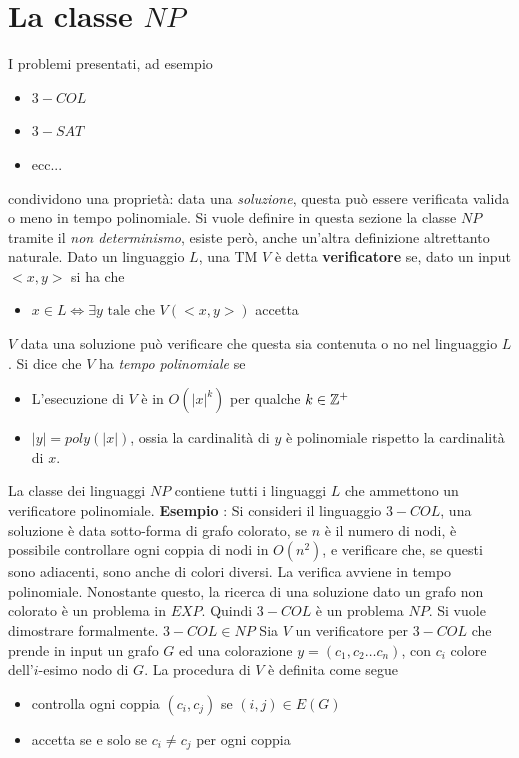 \documentclass[10pt, letterpaper]{report}
\begin{document}
\section{La classe $NP$}
I problemi presentati, ad esempio 
\begin{itemize}
    \item $3-COL$
    \item $3-SAT$
    \item ecc...
\end{itemize}
condividono una proprietà: data una \textit{soluzione}, questa può essere verificata valida o meno in tempo polinomiale. Si vuole definire in questa sezione la classe $NP$ tramite il \textit{non determinismo}, esiste però, anche un'altra definizione altrettanto naturale.\acc 
{} Dato un linguaggio $L$, una TM $V$ è detta \textbf{verificatore} se, dato un input $<x,y>$ si ha che \begin{itemize}
    \item $x\in L \iff \exists y \text{ tale che }V(<x,y>)$ accetta
\end{itemize}
$V$ data una soluzione può verificare che questa sia contenuta o no nel linguaggio $L$. Si dice che $V$ ha \textit{tempo polinomiale} se \begin{itemize}
    \item L'esecuzione di $V$ è in $O(|x|^k)$ per qualche $k\in{\mathbb Z}^+$
    \item $|y|=poly(|x|)$, ossia la cardinalità di $y$ è polinomiale rispetto la cardinalità di $x$.
\end{itemize}
 La classe dei linguaggi $NP$ contiene tutti i linguaggi $L$ che ammettono un verificatore polinomiale.\acc 
\textbf{Esempio} : Si consideri il linguaggio $3-COL$, una soluzione è data sotto-forma di grafo colorato, se $n$ è il numero di nodi,  è possibile controllare ogni coppia di nodi in $O(n^2)$, e verificare che, se questi sono adiacenti, sono anche di colori diversi. La verifica avviene in tempo polinomiale. Nonostante questo, la ricerca di una soluzione dato un grafo non colorato è un problema in $EXP$. Quindi $3-COL$ è un problema $NP$. Si vuole dimostrare formalmente.\acc
\prop{} $3-COL\in NP$\acc 
\dimo{} Sia $V$ un verificatore per $3-COL$ che prende in input un grafo $G$ ed una colorazione 
$y=(c_1,c_2\dots c_n)$, con $c_i$ colore dell'$i$-esimo nodo di $G$. La procedura di $V$ è definita come segue\begin{itemize}
    \item controlla ogni coppia $(c_i,c_j)$ se $(i,j)\in E(G)$ 
    \item accetta se e solo se $c_i\ne c_j$ per ogni coppia 
\end{itemize}
\end{document}
